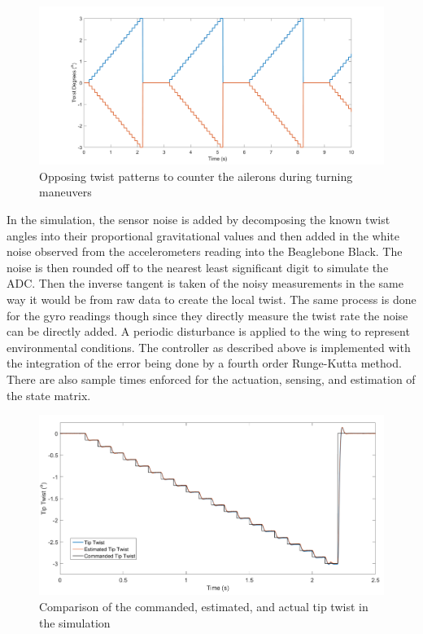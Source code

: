 \documentclass[11pt]{ucthesis}
\begin{document}
\begin{figure}[thpb]
\centering
\includegraphics[width=1\linewidth]{Figures/ProverseYawTwist.png}
\caption{Opposing twist patterns to counter the ailerons during turning maneuvers}
\label{fig:APTwist}
\end{figure}

In the simulation, the sensor noise is added by decomposing the known twist angles into their proportional gravitational values and then added in the white noise observed from the accelerometers reading into the Beaglebone Black. The noise is then rounded off to the nearest least significant digit to simulate the ADC. Then the inverse tangent is taken of the noisy measurements in the same way it would be from raw data to create the local twist. The same process is done for the gyro readings though since they directly measure the twist rate the noise can be directly added. A periodic disturbance is applied to the wing to represent environmental conditions. The controller as described above is implemented with the integration of the error being done by a fourth order Runge-Kutta method. There are also sample times enforced for the actuation, sensing, and estimation of the state matrix.

\begin{figure}[thpb]
\centering
\includegraphics[width=1\linewidth]{Figures/AuroraProverseYawTwist.png}
\caption{Comparison of the commanded, estimated, and actual tip twist in the simulation}
\label{fig:APcommand}
\end{figure}
\end{document}
